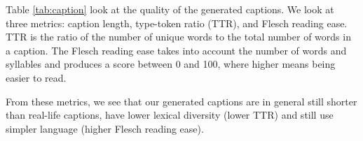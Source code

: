 Table \ref{tab:caption} look at the quality of the generated captions. We look
at three metrics: caption length, type-token ratio (TTR), and Flesch reading
ease. TTR is the ratio of the number of unique words to the total number of
words in a caption. The Flesch reading ease takes into account the number of
words and syllables and produces a score between 0 and 100, where higher means
being easier to read.

From these metrics, we see that our generated captions are in general still
shorter than real-life captions, have lower lexical diversity (lower TTR)
and still use simpler language (higher Flesch reading ease).
